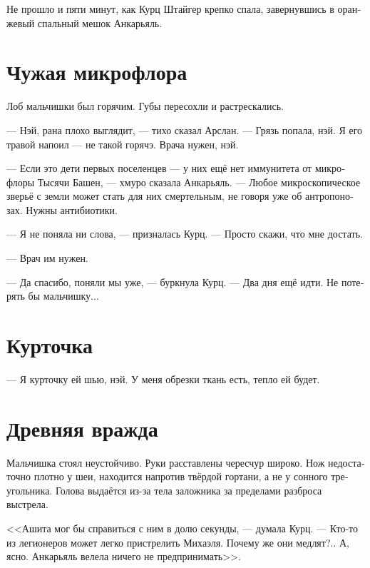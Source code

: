 \documentclass[a4paper,10pt,fleqn]{book}\usepackage{polyglossia}\setdefaultlanguage[babelshorthands=true]{russian}\setotherlanguage{english}\defaultfontfeatures{Ligatures=TeX,Mapping=tex-text}\usepackage{xcolor}\newcommand{\ml}[3]{#2}
\begin{document}
Не прошло и пяти минут, как Курц Штайгер крепко спала, завернувшись в оранжевый спальный мешок Анкарьяль.

\section{Чужая микрофлора}

Лоб мальчишки был горячим.
Губы пересохли и растрескались.

--- Нэй, рана плохо выглядит, --- тихо сказал Арслан.
--- Грязь попала, нэй.
Я его травой напоил --- не такой горячэ.
Врача нужен, нэй.

--- Если это дети первых поселенцев --- у них ещё нет иммунитета от микрофлоры Тысячи Башен, --- хмуро сказала Анкарьяль.
--- Любое микроскопическое зверьё с земли может стать для них смертельным, не говоря уже об антропонозах.
Нужны антибиотики.

--- Я не поняла ни слова, --- призналась Курц.
--- Просто скажи, что мне достать.

--- Врач им нужен.

--- Да спасибо, поняли мы уже, --- буркнула Курц.
--- Два дня ещё идти.
Не потерять бы мальчишку...

\section{Курточка}

--- Я курточку ей шью, нэй.
У меня обрезки ткань есть, тепло ей будет.

\section{Древняя вражда}

Мальчишка стоял неустойчиво.
Руки расставлены чересчур широко.
Нож недостаточно плотно у шеи, находится напротив твёрдой гортани, а не у сонного треугольника.
Голова выдаётся из-за тела заложника за пределами разброса выстрела.

\ml{$0$}
{<<Ашита мог бы справиться с ним в долю секунды, --- думала Курц.}
{\textit{Ashita could handle him in a split second,} Kurz thought.}
\ml{$0$}
{--- Кто-то из легионеров может легко пристрелить Михаэля.}
{\textit{One of the legionaires could easily shoot Michael.}}
\ml{$0$}
{Почему же они медлят?..}
{\textit{Why do they hesitate ...?}}
\ml{$0$}
{А, ясно.}
{\textit{Ah, I see.}}
\ml{$0$}
{Анкарьяль велела ничего не предпринимать>>.}
{\textit{Angaralle told no moves.}}
\end{document}

